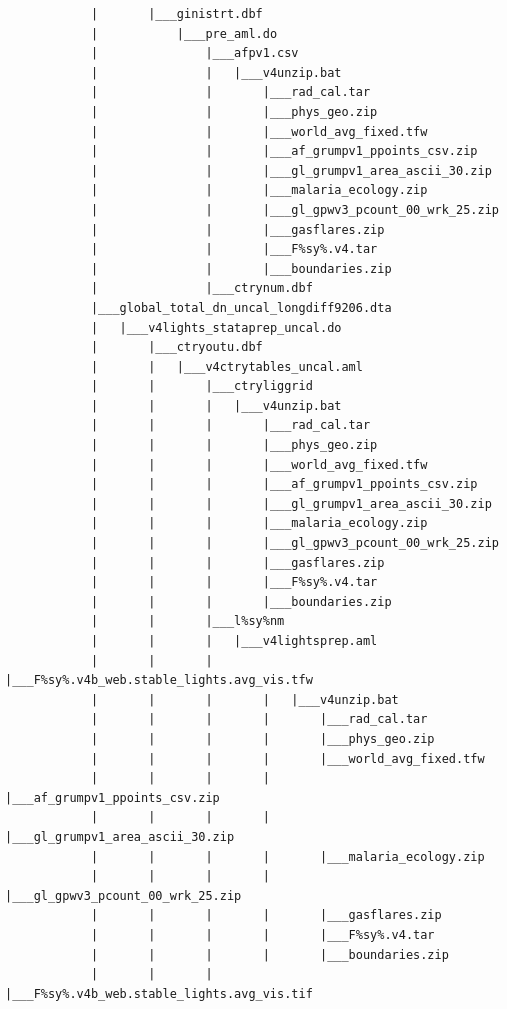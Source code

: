 \documentclass[]{book}
\begin{document}
\begin{verbatim}
            |       |___ginistrt.dbf
            |           |___pre_aml.do
            |               |___afpv1.csv
            |               |   |___v4unzip.bat
            |               |       |___rad_cal.tar
            |               |       |___phys_geo.zip
            |               |       |___world_avg_fixed.tfw
            |               |       |___af_grumpv1_ppoints_csv.zip
            |               |       |___gl_grumpv1_area_ascii_30.zip
            |               |       |___malaria_ecology.zip
            |               |       |___gl_gpwv3_pcount_00_wrk_25.zip
            |               |       |___gasflares.zip
            |               |       |___F%sy%.v4.tar
            |               |       |___boundaries.zip
            |               |___ctrynum.dbf
            |___global_total_dn_uncal_longdiff9206.dta
            |   |___v4lights_stataprep_uncal.do
            |       |___ctryoutu.dbf
            |       |   |___v4ctrytables_uncal.aml
            |       |       |___ctryliggrid
            |       |       |   |___v4unzip.bat
            |       |       |       |___rad_cal.tar
            |       |       |       |___phys_geo.zip
            |       |       |       |___world_avg_fixed.tfw
            |       |       |       |___af_grumpv1_ppoints_csv.zip
            |       |       |       |___gl_grumpv1_area_ascii_30.zip
            |       |       |       |___malaria_ecology.zip
            |       |       |       |___gl_gpwv3_pcount_00_wrk_25.zip
            |       |       |       |___gasflares.zip
            |       |       |       |___F%sy%.v4.tar
            |       |       |       |___boundaries.zip
            |       |       |___l%sy%nm
            |       |       |   |___v4lightsprep.aml
            |       |       |       |___F%sy%.v4b_web.stable_lights.avg_vis.tfw
            |       |       |       |   |___v4unzip.bat
            |       |       |       |       |___rad_cal.tar
            |       |       |       |       |___phys_geo.zip
            |       |       |       |       |___world_avg_fixed.tfw
            |       |       |       |       |___af_grumpv1_ppoints_csv.zip
            |       |       |       |       |___gl_grumpv1_area_ascii_30.zip
            |       |       |       |       |___malaria_ecology.zip
            |       |       |       |       |___gl_gpwv3_pcount_00_wrk_25.zip
            |       |       |       |       |___gasflares.zip
            |       |       |       |       |___F%sy%.v4.tar
            |       |       |       |       |___boundaries.zip
            |       |       |       |___F%sy%.v4b_web.stable_lights.avg_vis.tif

\end{verbatim}
\end{document}
